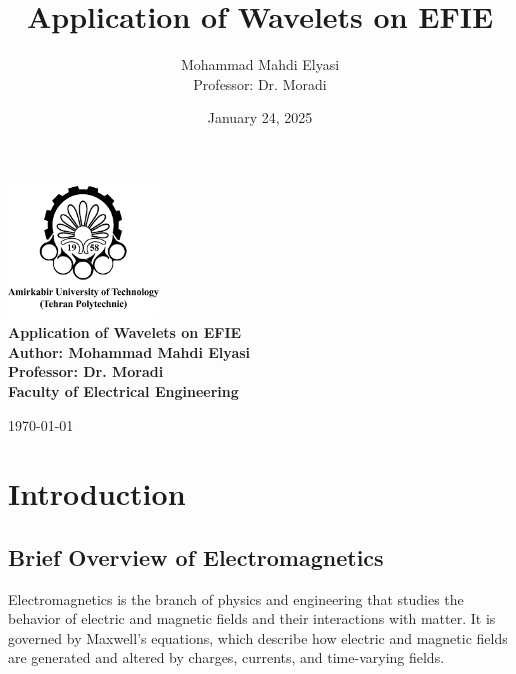 \documentclass[12pt]{article}
\title{Application of Wavelets on EFIE}
\author{Mohammad Mahdi Elyasi \\ Professor: Dr. Moradi}
\date{January 24, 2025}
\begin{document}
\begin{center}
    \includegraphics[width=0.3\textwidth]{amirkabir.png} \\[2em]
    \LARGE \textbf{Application of Wavelets on EFIE} \\[1em]
    \large \textbf{Author: Mohammad Mahdi Elyasi} \\[1em]
    \large \textbf{Professor: Dr. Moradi} \\[4em]
    \large \textbf{Faculty of Electrical Engineering} \\[2em]

\end{center}

\vfill
\begin{center}
    \large \today
\end{center}


\newpage

\tableofcontents
\newpage

\section{Introduction}

\subsection{Brief Overview of Electromagnetics}
Electromagnetics is the branch of physics and engineering that studies the behavior of electric and magnetic fields and their interactions with matter. It is governed by Maxwell’s equations, which describe how electric and magnetic fields are generated and altered by charges, currents, and time-varying fields.
\end{document}
